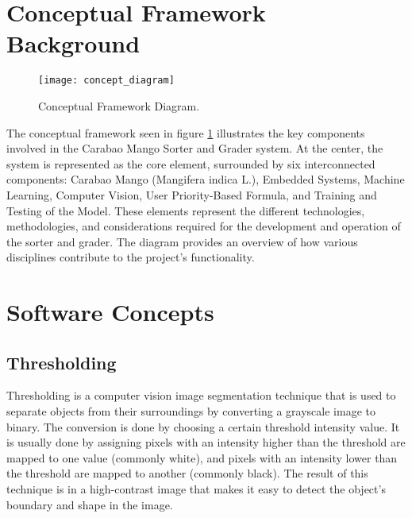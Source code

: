 \section{Conceptual Framework Background}

\begin{figure}[!htbp]
	\centering
	\texttt{[image: concept\_diagram]}
	\caption{Conceptual Framework Diagram.}
	\label{fig:theoreticalDiagram2}
\end{figure}
 
The conceptual framework seen in figure \ref{fig:theoreticalDiagram2}
illustrates the key components involved in the Carabao Mango Sorter and Grader
system. At the center, the system is represented as the core element, surrounded
by six interconnected components: Carabao Mango (Mangifera indica L.), Embedded
Systems, Machine Learning, Computer Vision, User Priority-Based Formula, and
Training and Testing of the Model. These elements represent the different
technologies, methodologies, and considerations required for the development and
operation of the sorter and grader. The diagram provides an overview of how
various disciplines contribute to the project’s functionality.

\section{Software Concepts}

\subsection{Thresholding}
Thresholding is a computer vision image segmentation technique that is used to
separate objects from their surroundings by converting a grayscale image to
binary. The conversion is done by choosing a certain threshold intensity value.
It is usually done by assigning pixels with an intensity higher than the
threshold are mapped to one value (commonly white), and pixels with an intensity
lower than the threshold are mapped to another (commonly black). The result of
this technique is in a high-contrast image that makes it easy to detect the
object's boundary and shape in the image.\\


